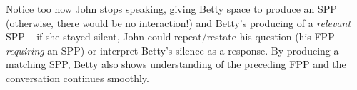 \documentclass[11pt]{article}
\begin{document}
{    %
    Notice too how John stops speaking, giving Betty space to produce an SPP (otherwise, there would be no interaction!)
    and Betty's producing of a \textit{relevant} SPP -- if she stayed silent, John could repeat/restate his question (his FPP \textit{requiring} an SPP) or interpret Betty's silence as a response.
    By producing a matching SPP, Betty also shows understanding of the preceding FPP and the conversation continues smoothly.

}
\end{document}
